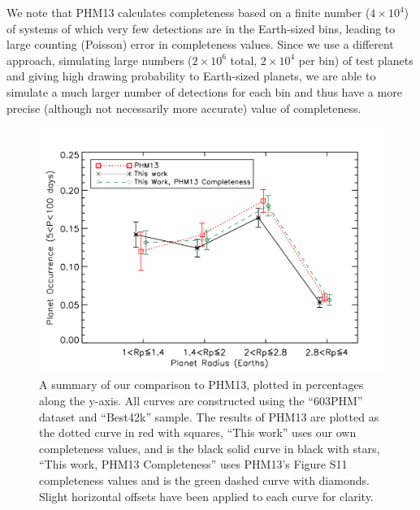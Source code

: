 We note that PHM13 calculates completeness 
based on a finite number ($4 \times 10^4$) of systems of which very few detections 
are in the Earth-sized bins, leading to large counting (Poisson) error in completeness 
values.  Since we use a different approach, simulating large numbers ($2 \times 10^6$ total, 
$2 \times 10^4$ per bin) of test planets and giving high drawing probability 
to Earth-sized planets, we are able to simulate a much larger number of detections 
for each bin and thus have a more precise (although not necessarily more accurate) 
value of completeness.

\begin{figure}
\centerline{\includegraphics[scale=0.55]{chap2/PHM13_mastercomp.pdf}}
\caption{A summary of our comparison to PHM13, plotted in percentages 
  along the y-axis. All curves are constructed using the ``603PHM'' 
  dataset and ``Best42k'' sample. The results
  of PHM13 are plotted as the dotted curve in red with
  squares, ``This work'' uses our own completeness values, and is the black
  solid curve in black with stars, ``This work, PHM13 Completeness'' uses PHM13's Figure
  S11 completeness values and is the green
  dashed curve with diamonds. Slight horizontal offsets have
  been applied to each curve for clarity.}
\label{fig:mastercomp} 
\end{figure}

